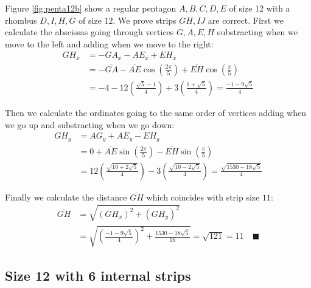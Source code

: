 \documentclass[11pt]{article}
\begin{document}
Figure \ref{fig:penta12b} show a regular pentagon $A,B,C,D,E$ of size 12 with a rhombus $D,I,H,G$ of size $12$. We prove strips $GH,IJ$ are correct. First we calculate the abscissas going through vertices $G,A,E,H$ substracting when we move to the left and adding when we move to the right:
\begin{align}
GH_x &= -GA_x - AE_x + EH_x\nonumber\\
 &= -\overline{GA} - \overline{AE}\cos\left(\frac{2\pi}5\right)
 +\overline{EH}\cos\left(\frac{\pi}5\right)\nonumber\\
 &= -4 - 12\left(\frac{\sqrt5 - 1}4\right) + 3\left(\frac{1+\sqrt5}4\right)
 = \frac{-1-9\sqrt5}4
\end{align}

Then we calculate the ordinates going to the same order of vertices adding when we go up and substracting when we go down:
\begin{align}
GH_y &= AG_y + AE_y - EH_y\nonumber\\
 &= 0 + \overline{AE}\sin\left(\frac{2\pi}5\right)
 - \overline{EH}\sin\left(\frac{\pi}5\right)\nonumber\\
 &= 12\left(\frac{\sqrt{10+2\sqrt5}}4\right)
 - 3\left(\frac{\sqrt{10-2\sqrt5}}4\right)%
 = \frac{\sqrt{1530-18\sqrt5}}4
\end{align}

Finally we calculate the distance $\overline{GH}$ which coincides with strip size $11$:
\begin{align}
\overline{GH} &= \sqrt{(GH_x)^2 + (GH_y)^2}\nonumber\\
 &= \sqrt{\left(\frac{-1-9\sqrt5}{4}\right)^2 + \frac{1530-18\sqrt5}{16}}%
 = \sqrt{121} = 11 \quad\blacksquare
\end{align}

\subsection{Size 12 with 6 internal strips}
\end{document}
